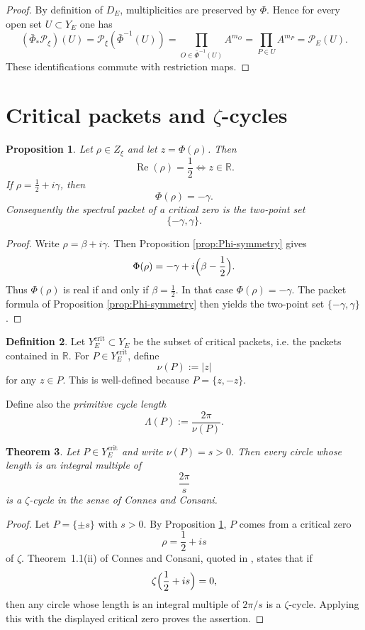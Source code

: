 \documentclass[11pt,a4paper]{article}
\numberwithin{equation}{section}
\newtheorem{theorem}{Theorem}[section]
\newtheorem{proposition}[theorem]{Proposition}
\theoremstyle{definition}
\newtheorem{definition}[theorem]{Definition}
\theoremstyle{remark}
\DeclareMathOperator{\Rea}{Re}
\newcommand{\RR}{\mathbb R}
\newcommand{\cP}{\mathcal P}
\begin{document}
\begin{proof}
By definition of $D_E$, multiplicities are preserved by $\Phi$.  Hence for every open set $U\subset Y_E$ one has
\[
(\bar\Phi_*\cP_\xi)(U)=\cP_\xi(\bar\Phi^{-1}(U))
=\prod_{O\in \bar\Phi^{-1}(U)} A^{m_O}
=\prod_{P\in U} A^{m_P}
=\cP_E(U).
\]
These identifications commute with restriction maps.
\end{proof}

\section{Critical packets and $\zeta$-cycles}

\begin{proposition}\label{prop:critical-real}
Let $\rho\in Z_\xi$ and let $z=\Phi(\rho)$.  Then
\[
\Rea(\rho)=\frac12
\iff
z\in\RR.
\]
If $\rho=\frac12+i\gamma$, then
\[
\Phi(\rho)=-\gamma.
\]
Consequently the spectral packet of a critical zero is the two-point set
\[
\{-\gamma,\gamma\}.
\]
\end{proposition}

\begin{proof}
Write $\rho=\beta+i\gamma$.  Then Proposition \ref{prop:Phi-symmetry} gives
\[
\Phi(\rho)=-\gamma+i\Bigl(\beta-\frac12\Bigr).
\]
Thus $\Phi(\rho)$ is real if and only if $\beta=\frac12$.  In that case $\Phi(\rho)=-\gamma$.  The packet formula of Proposition \ref{prop:Phi-symmetry} then yields the two-point set $\{-\gamma,\gamma\}$.
\end{proof}

\begin{definition}
Let $Y_E^{\mathrm{crit}}\subset Y_E$ be the subset of critical packets, i.e. the packets contained in $\RR$.  For $P\in Y_E^{\mathrm{crit}}$, define
\[
\nu(P):=|z|
\]
for any $z\in P$.  This is well-defined because $P=\{z,-z\}$.

Define also the \emph{primitive cycle length}
\[
\Lambda(P):=\frac{2\pi}{\nu(P)}.
\]
\end{definition}

\begin{theorem}\label{thm:zeta-cycles}
Let $P\in Y_E^{\mathrm{crit}}$ and write $\nu(P)=s>0$.  Then every circle whose length is an integral multiple of
\[
\frac{2\pi}{s}
\]
is a $\zeta$-cycle in the sense of Connes and Consani.
\end{theorem}

\begin{proof}
Let $P=\{\pm s\}$ with $s>0$.  By Proposition \ref{prop:critical-real}, $P$ comes from a critical zero
\[
\rho=\frac12+is
\]
of $\zeta$.  Theorem~1.1(ii) of Connes and Consani, quoted in \cite{ConnesConsaniCycles}, states that if
\[
\zeta\Bigl(\frac12+is\Bigr)=0,
\]
then any circle whose length is an integral multiple of $2\pi/s$ is a $\zeta$-cycle.  Applying this with the displayed critical zero proves the assertion.
\end{proof}
\end{document}
